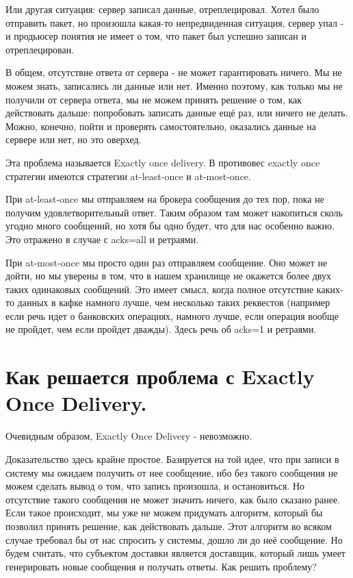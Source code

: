 \documentclass[11pt]{article}
\begin{document}
    Или другая ситуация: сервер записал данные, отреплецировал. Хотел было отправить пакет, но произошла какая-то непредвиденная ситуация, сервер упал - и продьюсер понятия не имеет о том, что пакет был успешно записан и отреплецирован.

    В общем, отсутствие ответа от сервера - не может гарантировать ничего. Мы не можем знать, записались ли данные или нет. Именно поэтому, как только мы не получили от сервера ответа, мы не можем принять решение о том, как действовать дальше: попробовать записать данные ещё раз, или ничего не делать. Можно, конечно, пойти и проверять самостоятельно, оказались данные на сервере или нет, но это оверхед.

    Эта проблема называется Exactly once delivery. В противовес exactly once стратегии имеются стратегии at-least-once и at-most-once.

    При at-least-once мы отправляем на брокера сообщения до тех пор, пока не получим удовлетворительный ответ. Таким образом там может накопиться сколь угодно много сообщений, но хотя бы одно будет, что для нас особенно важно. Это отражено в случае с acks=all и ретраями.

    При at-most-once мы просто один раз отправляем сообщение. Оно может не дойти, но мы уверены в том, что в нашем хранилище не окажется более двух таких одинаковых сообщений. Это имеет смысл, когда полное отсутствие каких-то данных в кафке намного лучше, чем несколько таких реквестов (например если речь идет о банковских операциях, намного лучше, если операция вообще не пройдет, чем если пройдет дважды). Здесь речь об acks=1 и ретраями.

    \section{Как решается проблема с Exactly Once Delivery.}
    Очевидным образом, Exactly Once Delivery - невозможно.

    Доказательство здесь крайне простое. Базируется на той идее, что при записи в систему мы ожидаем получить от нее
    сообщение, ибо без такого сообщения не можем сделать вывод о том, что запись произошла, и остановиться. Но
    отсутствие такого сообщения не может значить ничего, как было сказано ранее.
    Если такое происходит, мы уже не можем придумать алгоритм, который бы позволил принять решение, как действовать дальше. Этот алгоритм во всяком случае требовал бы от нас спросить у системы, дошло ли до неё сообщение. Но будем считать, что субъектом доставки является доставщик, который лишь умеет генерировать новые сообщения и получать ответы. Как решить проблему?
\end{document}
